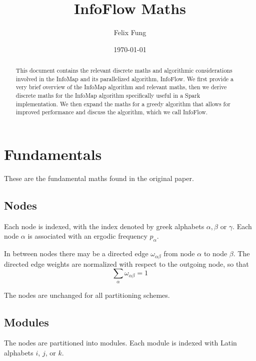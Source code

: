 \documentclass[12pt,a4paper]{article}
\title{InfoFlow Maths}
\author{Felix Fung}
\date{\today}
\begin{document}
\maketitle

\begin{abstract}
This document contains the relevant discrete maths and algorithmic considerations involved in the InfoMap and its parallelized algorithm, InfoFlow. We first provide a very brief overview of the InfoMap algorithm and relevant maths, then we derive discrete maths for the InfoMap algorithm specifically useful in a Spark implementation. We then expand the maths for a greedy algorithm that allows for improved performance and discuss the algorithm, which we call InfoFlow.
\end{abstract}

\tableofcontents

\section{Fundamentals}

These are the fundamental maths found in the original paper.

\subsection{Nodes}

Each node is indexed, with the index denoted by greek alphabets \(\alpha,\beta\) or \(\gamma\). Each node \(\alpha\) is associated with an ergodic frequency \(p_\alpha\).

In between nodes there may be a directed edge \(\omega_{\alpha\beta}\) from node \(\alpha\) to node \(\beta\). The directed edge weights are normalized with respect to the outgoing node, so that
\[
    \sum_\alpha \omega_{\alpha\beta} = 1
\]

The nodes are unchanged for all partitioning schemes.

\subsection{Modules}

The nodes are partitioned into modules. Each module is indexed with Latin alphabets \(i\), \(j\), or \(k\).
\end{document}
